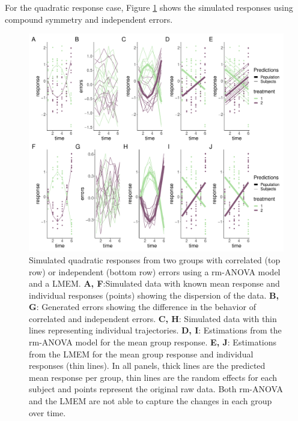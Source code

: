 \documentclass[
]{article}
\begin{document}
For the quadratic response case, Figure \ref{fig:quadratic-cases-Appendix} shows the simulated responses using compound symmetry and independent errors.



\begin{figure}

{\centering \includegraphics[width=1\linewidth]{Appendix_B_files/figure-latex/quadratic-cases-Appendix-1} 

}

\caption{Simulated quadratic responses from two groups with correlated (top row) or independent (bottom row) errors using a rm-ANOVA model and a LMEM. \textbf{A, F}:Simulated data with known mean response and individual responses (points) showing the dispersion of the data. \textbf{B, G}: Generated errors showing the difference in the behavior of correlated and independent errors. \textbf{C, H}: Simulated data with thin lines representing individual trajectories. \textbf{D, I}: Estimations from the rm-ANOVA model for the mean group response. \textbf{E, J}: Estimations from the LMEM for the mean group response and individual responses (thin lines). In all panels, thick lines are the predicted mean response per group, thin lines are the random effects for each subject and points represent the original raw data. Both rm-ANOVA and the LMEM are not able to capture the changes in each group over time.}\label{fig:quadratic-cases-Appendix}
\end{figure}
\end{document}
